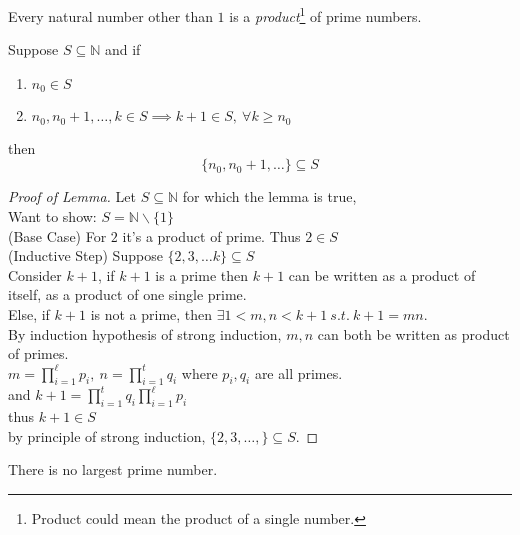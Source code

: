 \documentclass[11pt]{article}
\begin{document}
	\begin{lemma}
		Every natural number other than $1$ is a \emph{product}\footnote{Product could mean the product of a single number.} of prime numbers.
	\end{lemma}
	
	\begin{theorem}
		Suppose $S \subseteq \mathbb{N}$ and if 
		\begin{enumerate}
			\item $n_0 \in S$
			\item $n_0, n_0 + 1, \dots, k \in S \implies k+1 \in S,\ \forall k \geq n_0$
		\end{enumerate}
		then 
		\[
			\{n_0, n_0 + 1, \dots\} \subseteq S
		\]
	\end{theorem}
	\begin{proof} [Proof of Lemma]
		Let $S \subseteq \mathbb{N}$ for which the lemma is true, \\
		Want to show: $S = \mathbb{N} \backslash \{1\}$ \\
		(Base Case) For $2$ it's a product of prime. Thus $2 \in S$ \\
		(Inductive Step) Suppose $\{2,3, \dots k\} \subseteq S$ \\
		Consider $k+1$, if $k+1$ is a prime then $k+1$ can be written as a product of itself, as a product of one single prime.\\
		Else, if $k+1$ is not a prime, then $\exists 1<m,n<k+1\ s.t.\ k+1 = mn$.\\
		By induction hypothesis of strong induction, $m,n$ can both be written as product of primes. \\
		$m = \prod_{i=1}^\ell {p_i},\ n = \prod_{i=1}^t {q_i}$ where $p_i, q_i$ are all primes.\\
		and $k+1 = \prod_{i=1}^t{q_i}\prod_{i=1}^\ell {p_i}$ \\
		thus $k+1 \in S$ \\ 
		by principle of strong induction, $\{2,3,\dots,\} \subseteq S$.
	\end{proof}
	
	\begin{theorem}
		There is no largest prime number.
	\end{theorem}
	
\end{document}

